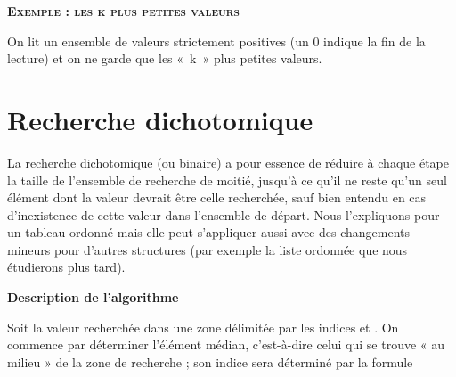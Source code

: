 	{\sffamily\bfseries\scshape
	Exemple : les k plus petites valeurs}

		On lit un ensemble de valeurs strictement positives (un 0 indique la fin
		de la lecture) et on ne garde que les «~k~» plus petites valeurs.

		\bigskip
		
		

\section{Recherche dichotomique}

	La recherche dichotomique (ou binaire) a pour essence de réduire à
	chaque étape la taille de l’ensemble de recherche de moitié, jusqu’à ce
	qu’il ne reste qu’un seul élément dont la valeur devrait être celle
	recherchée, sauf bien entendu en cas d’inexistence de cette valeur dans
	l’ensemble de départ. Nous l’expliquons pour un tableau ordonné mais
	elle peut s’appliquer aussi avec des changements mineurs pour
	d'autres structures (par exemple la liste ordonnée que
	nous étudierons plus tard).

	{\sffamily\bfseries\upshape
	Description de l’algorithme}

	Soit  la valeur recherchée dans une zone
	délimitée par les indices  et
	. On commence par déterminer l’élément
	médian, c’est-à-dire celui qui se trouve « au milieu » de la zone de
	recherche ; son indice sera déterminé par la formule

